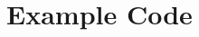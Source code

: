 \documentclass[
minp=25,
maxp=30,
letterpaper,
]{smcm-cosc-smp}[2013/12/23]
\begin{document}






\appendix

\section{Example Code}


\nocite{*}
\newpage
\printbibliography

\todos
\end{document}
